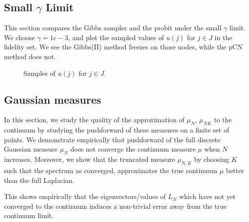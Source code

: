 \documentclass[final]{siamart0516}
\begin{document}
\subsection{Small $\gamma$ Limit}
This section compares the Gibbs sampler and the probit under the small $\gamma$ limit. We choose $\gamma = 1e-3$, and plot the sampled values of $u(j)$ for $j\in J$ in the fidelity set. We see the Gibbs(II) method freezes on those nodes, while the pCN method does not.

\begin{figure}[!ht]
\centering
{}
\caption{Samples of $u(j)$ for $j \in J$.}\label{fig:uj-smallgamma}
\end{figure}

\subsection{Gaussian measures}
In this section, we study the quality of the approximation of $\mu_N$, $\mu_{NK}$ to the continuum by studying the pushforward of these measures on a finite set of points. We demonstrate empirically that pushforward of the full discrete Gaussian measure $\mu_N$ does not converge the continuum measure $\mu$ when $N$ increases.  Moreover, we show that the truncated measure $\mu_{N,K}$ by choosing $K$ such that the spectrum as converged, approximates the true continuum $\mu$ better than the full Laplacian.

This shows empirically that the eigenvectors/values of $L_N$ which have not yet converged to the continuum induces a non-trivial error away from the true continuum limit.
\end{document}
